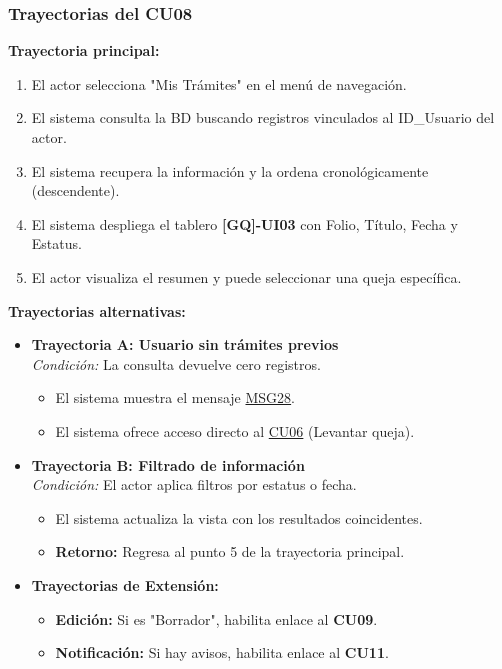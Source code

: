 \begin{appendices}
\subsubsection{Trayectorias del CU08}
\textbf{Trayectoria principal:}
\begin{enumerate}[nosep]
    \item El actor selecciona "Mis Trámites" en el menú de navegación.
    \item El sistema consulta la BD buscando registros vinculados al ID\_Usuario del actor.
    \item El sistema recupera la información y la ordena cronológicamente (descendente).
    \item El sistema despliega el tablero \textbf{[GQ]-UI03} con Folio, Título, Fecha y Estatus.
    \item El actor visualiza el resumen y puede seleccionar una queja específica.
\end{enumerate}

\textbf{Trayectorias alternativas:}
\begin{itemize}[leftmargin=*]
    \item \textbf{Trayectoria A: Usuario sin trámites previos} \\
    \textit{Condición:} La consulta devuelve cero registros.
    \begin{itemize}[nosep]
        \item[A-1:] El sistema muestra el mensaje \hyperlink{msg:MSG28}{MSG28}.
        \item[A-2:] El sistema ofrece acceso directo al \hyperlink{anexo:casos_uso}{CU06} (Levantar queja).
    \end{itemize}
    \item \textbf{Trayectoria B: Filtrado de información} \\
    \textit{Condición:} El actor aplica filtros por estatus o fecha.
    \begin{itemize}[nosep]
        \item[B-1:] El sistema actualiza la vista con los resultados coincidentes.
        \item \textbf{Retorno:} Regresa al punto 5 de la trayectoria principal.
    \end{itemize}
    \item \textbf{Trayectorias de Extensión:}
    \begin{itemize}[nosep]
        \item \textbf{Edición:} Si es "Borrador", habilita enlace al \textbf{CU09}.
        \item \textbf{Notificación:} Si hay avisos, habilita enlace al \textbf{CU11}.
    \end{itemize}
\end{itemize}


\end{appendices}
